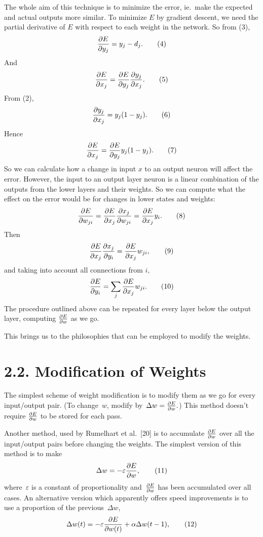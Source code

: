 \documentclass[12pt]{report}
\begin{document}
The whole aim of this technique is to minimize the error, ie.\ make the
expected and actual outputs more similar.
To minimize $E$ by gradient descent, we need the partial derivative of
$E$ with respect to each weight in the network.
So from (3),
$$
{\partial E \over \partial y_j} = y_j - d_j. \qquad\text{(4)}
$$
And
$$
{\partial E \over \partial x_j} = {\partial E \over \partial y_j}
	{\partial y_j \over \partial x_j}. \qquad\text{(5)}
$$
From (2),
$$
{\partial y_j \over \partial x_j} = y_j(1-y_j).\qquad\text{(6)}
$$
Hence
$$
{\partial E \over \partial x_j} = {\partial E \over \partial y_j}
	y_j(1-y_j).\qquad\text{(7)}
$$
So we can calculate how a change in input $x$ to an output neuron will
affect the error.
However, the input to an output layer neuron is a linear combination of
the outputs from the lower layers and their weights.
So we can compute what the effect on the error would be for changes in
lower states and weights:
$$
{\partial E \over \partial w_{ji}} = {\partial E \over \partial x_j}
	{\partial x_j \over \partial w_{ji}} = {\partial E \over
		\partial x_j} y_i.\qquad\text{(8)}
$$
Then
$$
{\partial E \over \partial x_j} {\partial x_j \over \partial y_i}
	= {\partial E \over \partial x_j} w_{ji},\qquad\text{(9)}
$$
and taking into account all connections from $i,$
$$
{\partial E \over \partial y_i} = \sum_j {\partial E \over \partial x_j}
w_{ji}.\qquad\text{(10)}
$$
The procedure outlined above can be repeated for every layer below the
output layer, computing
$ \partial E \over \partial w$ as we go.

This brings us to the philosophies that can be employed to modify the
weights.

\section{2.2. Modification of Weights}

The simplest scheme of weight modification is to modify them as we go
for every input/output pair. (To change~$w$, modify by~$\Delta w =
{\partial E \over \partial w}.$)
This method doesn't require $\partial E \over \partial w$ to be stored
for each pass.

Another method, used by Rumelhart et al.\ [20] is to accumulate
$\partial E \over \partial w$ over all the input/output pairs before
changing the weights.
The simplest version of this method is to make
$$
\Delta w = - \varepsilon {\partial E \over \partial w}, \qquad\text{(11)}
$$
where~$\varepsilon$ is a constant of proportionality and~$\partial E \over
\partial w$ has been accumulated over all cases.
An alternative version which apparently offers speed improvements is to
use a proportion of the previous~$\Delta w$,
$$
\Delta w(t) = -\varepsilon {\partial E \over \partial w(t)} + \alpha
			\Delta w(t-1), \qquad\text{(12)}
$$
\end{document}
